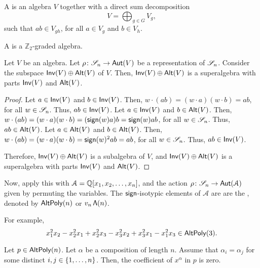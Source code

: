 \begin{definition}
    A  is an algebra \(V\) together with a direct sum decomposition
    \begin{equation}
        V = \bigoplus_{g \in G} V_g,
    \end{equation}
    such that \(ab \in V_{gh}\), for all \(a \in V_g\) and \(b \in V_h\).
\end{definition}

A  is a \(\mathbb{Z}_2\)-graded algebra.

\begin{theorem} \label{thm:inv-alt-super}
    Let \(V\) be an algebra.
    Let \(\rho \colon \mathscr{S}_{n} \to \operatorname{\mathsf{Aut}}(V)\) be a representation of \(\mathscr{S}_{n}\).
    Consider the subspace \(\operatorname{\mathsf{Inv}}(V) \oplus \operatorname{\mathsf{Alt}}(V)\) of \(V\).
    Then, \(\operatorname{\mathsf{Inv}}(V) \oplus \operatorname{\mathsf{Alt}}(V)\) is a superalgebra with parts \(\operatorname{\mathsf{Inv}}(V)\) and \(\operatorname{\mathsf{Alt}}(V)\).
\end{theorem}

\begin{proof}
    Let \(a \in \operatorname{\mathsf{Inv}}(V)\) and \(b \in \operatorname{\mathsf{Inv}}(V)\).
    Then, \(w \cdot (ab) = (w \cdot a) (w \cdot b) = a b\), for all \(w \in \mathscr{S}_{n}\).
    Thus, \(ab \in \operatorname{\mathsf{Inv}}(V)\).
    Let \(a \in \operatorname{\mathsf{Inv}}(V)\) and \(b \in \operatorname{\mathsf{Alt}}(V)\).
    Then, \(w \cdot (ab) = (w \cdot a) (w \cdot b) = (\operatorname{\mathsf{sign}}(w) a) b = \operatorname{\mathsf{sign}}(w) a b\), for all \(w \in \mathscr{S}_{n}\).
    Thus, \(ab \in \operatorname{\mathsf{Alt}}(V)\).
    Let \(a \in \operatorname{\mathsf{Alt}}(V)\) and \(b \in \operatorname{\mathsf{Alt}}(V)\).
    Then, \(w \cdot (ab) = (w \cdot a) (w \cdot b) = \operatorname{\mathsf{sign}}(w)^2 a b = a b\), for all \(w \in \mathscr{S}_{n}\).
    Thus, \(ab \in \operatorname{\mathsf{Inv}}(V)\).

    Therefore, \(\operatorname{\mathsf{Inv}}(V) \oplus \operatorname{\mathsf{Alt}}(V)\) is a subalgebra of \(V\),
    and \(\operatorname{\mathsf{Inv}}(V) \oplus \operatorname{\mathsf{Alt}}(V)\) is a superalgebra with parts \(\operatorname{\mathsf{Inv}}(V)\) and \(\operatorname{\mathsf{Alt}}(V)\).
\end{proof}

Now, apply this with \(\mathcal{A} = \mathbb{Q}[x_1, x_2, \ldots, x_n]\),
and the action \(\rho \colon \mathscr{S}_{n} \to \operatorname{\mathsf{Aut}}(\mathcal{A})\) given by
permuting the variables.
The \(\operatorname{\mathsf{sign}}\)-isotypic elements of \(\mathcal{A}\) are are the ,
denoted by \(\operatorname{\mathsf{AltPoly}}(n)\) or \(v_n\operatorname{\mathsf{\Lambda}}(n)\).

For example,
\begin{equation}
    x_1^2x_2 - x_2^2x_1 + x_2^2x_3 - x_3^2x_2 + x_3^2x_1 - x_1^2x_3 \in \operatorname{\mathsf{AltPoly}}(3).
\end{equation}

\begin{lemma}
Let \(p \in \operatorname{\mathsf{AltPoly}}(n)\).
Let \(\alpha\) be a composition of length \(n\).
Assume that \(\alpha_i = \alpha_j\) for some distinct \(i, j \in \interval{n}\).
Then, the coefficient of \(x^\alpha\) in \(p\) is zero.
\end{lemma}

